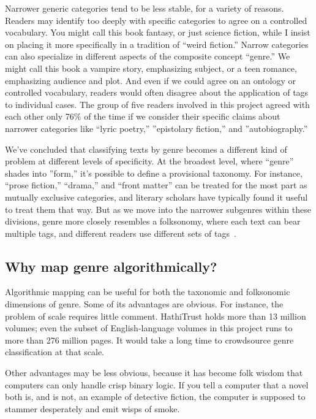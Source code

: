 \documentclass[paper=a4, fontsize=12pt]{scrartcl}
\numberwithin{equation}{section}		%
\numberwithin{figure}{section}			%
\numberwithin{table}{section}				%
\begin{document}
Narrower generic categories tend to be less stable, for a variety of reasons. Readers may identify too deeply with specific categories to agree on a controlled vocabulary. You might call this book fantasy, or just science fiction, while I insist on placing it more specifically in a tradition of ``weird fiction.'' Narrow categories can also specialize in different aspects of the composite concept ``genre.'' We might call this book a vampire story, emphasizing subject, or a teen romance, emphasizing audience and plot. And even if we could agree on an ontology or controlled vocabulary, readers would often disagree about the application of tags to individual cases. The group of five readers involved in this project agreed with each other only 76\% of the time if we consider their specific claims about narrower categories like ``lyric poetry,'' ''epistolary fiction,'' and ''autobiography.''

We've concluded that classifying texts by genre becomes a different kind of problem at different levels of specificity. At the broadest level, where ``genre'' shades into ''form,'' it's possible to define a provisional taxonomy. For instance, ``prose fiction,'' ``drama,'' and ``front matter'' can be treated for the most part as mutually exclusive categories, and literary scholars have typically found it useful to treat them that way. But as we move into the narrower subgenres within these divisions, genre more closely resembles a folksonomy, where each text can bear multiple tags, and different readers use different sets of tags~\cite{vanderwal:folksonomy}.

\subsection{Why map genre algorithmically?}

Algorithmic mapping can be useful for both the taxonomic and folksonomic dimensions of genre. Some of its advantages are obvious. For instance, the problem of scale requires little comment. HathiTrust holds more than 13 million volumes; even the subset of English-language volumes in this project runs to more than 276 million pages. It would take a long time to crowdsource genre classification at that scale.

Other advantages may be less obvious, because it has become folk wisdom that computers can only handle crisp binary logic. If you tell a computer that a novel both is, and is not, an example of detective fiction, the computer is supposed to stammer desperately and emit wisps of smoke.
\end{document}
